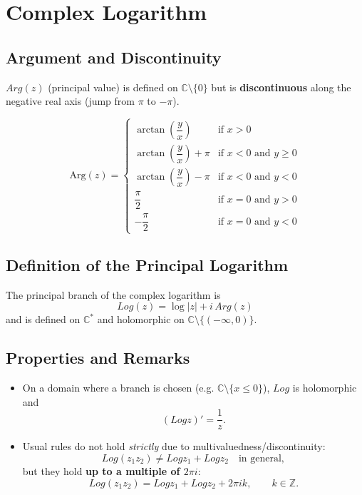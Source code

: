 \section{Complex Logarithm}

\subsection{Argument and Discontinuity}
$Arg(z)$ (principal value) is defined on $\mathbb{C}\setminus\{0\}$ but is \textbf{discontinuous} along the negative real axis
(jump from $\pi$ to $-\pi$).

\[
\text{Arg}(z) =
\begin{cases}
\arctan\left(\dfrac{y}{x}\right) & \text{if } x > 0 \\[6pt]
\arctan\left(\dfrac{y}{x}\right) + \pi & \text{if } x < 0 \text{ and } y \ge 0 \\[6pt]
\arctan\left(\dfrac{y}{x}\right) - \pi & \text{if } x < 0 \text{ and } y < 0 \\[6pt]
\dfrac{\pi}{2} & \text{if } x = 0 \text{ and } y > 0 \\[6pt]
-\dfrac{\pi}{2} & \text{if } x = 0 \text{ and } y < 0
\end{cases}
\]

\subsection{Definition of the Principal Logarithm}
The principal branch of the complex logarithm is
\[
\boxed{Log(z)=\log|z|+i\,Arg(z)}
\]
and is defined on $\mathbb{C}^*$ and holomorphic on $\mathbb{C} \setminus \{(-\infty, 0)\}$.

\subsection{Properties and Remarks}
\begin{itemize}
\item On a domain where a branch is chosen (e.g. $\mathbb{C}\setminus\{x\le 0\}$), $Log$ is holomorphic and
\[
(Log z)'=\frac{1}{z}.
\]
\item Usual rules do not hold \emph{strictly} due to multivaluedness/discontinuity:
\[
Log(z_1z_2)\neq Log z_1+Log z_2 \quad \text{in general},
\]
but they hold \textbf{up to a multiple of $2\pi i$}:
\[
Log(z_1z_2)=Log z_1+Log z_2 + 2\pi i k,\qquad k\in\mathbb{Z}.
\]
\end{itemize}
